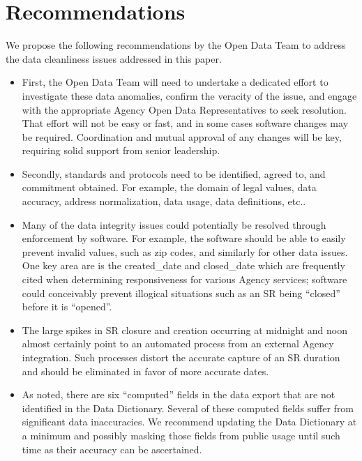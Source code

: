 \documentclass[12pt, titlepage]{article}
\begin{document}
\section{Recommendations} 
\label{sec:recommendations}
We propose the following recommendations by the Open Data Team to address
the data cleanliness issues addressed in this paper.


\begin{itemize}
	\item First, the Open Data Team will need 
	to undertake a dedicated effort to investigate these 
	data anomalies, confirm the veracity of the issue, 
	and engage with the appropriate Agency Open Data 
	Representatives to seek resolution. That effort will not 
	be easy or fast, and in some cases software changes may  
	be required. Coordination and mutual approval of any 
	changes will be key, requiring solid support 
	from senior leadership.

	\item Secondly, standards and protocols need to be 
	identified, agreed to, and commitment obtained. For example, 
	the domain of legal values, data accuracy, address normalization, 
	data usage, data definitions, etc..

	\item Many of the data integrity issues could potentially be 
	resolved through enforcement by software. For example, the 
	software should be able to easily prevent invalid values, such as zip 
	codes, and similarly for other data issues. One key area are is the 
	created\_date and closed\_date which are frequently cited 
	when determining responsiveness for various Agency services; software
	could conceivably prevent illogical situations such as an SR being
	``closed'' before it is ``opened''.
	
	\item The large spikes in SR closure and creation occurring at 
	midnight and noon almost certainly point to an automated 
	process from an external Agency integration. Such processes distort 
	the accurate capture of an SR duration and should be eliminated in
	favor of more accurate dates.
	
	\item As noted, there are six ``computed'' fields in the data export 
	that are not identified in the Data Dictionary. Several of 
	these computed fields suffer from significant data inaccuracies. We  
	recommend updating the Data Dictionary at a minimum and 
	possibly masking those fields from public usage until such time as 
	their accuracy can be ascertained.
	

\end{itemize}
\end{document}
